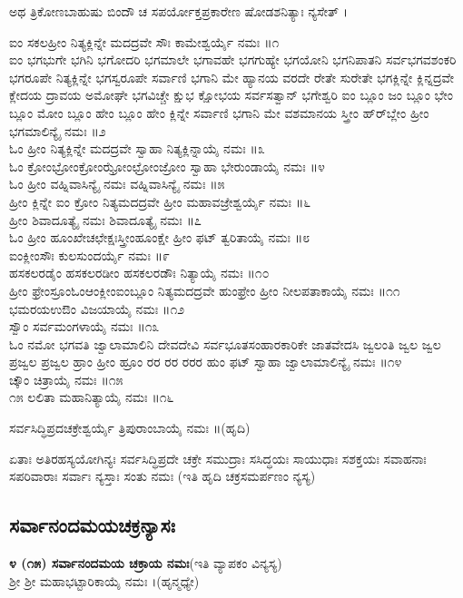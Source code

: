 ಅಥ ತ್ರಿಕೋಣಬಾಹುಷು ಬಿಂದೌ ಚ ಸಪರ್ಯೋಕ್ತಪ್ರಕಾರೇಣ ಷೋಡಶನಿತ್ಯಾಃ ನ್ಯಸೇತ್ ।

 ಐಂ ಸಕಲಹ್ರೀಂ ನಿತ್ಯಕ್ಲಿನ್ನೇ ಮದದ್ರವೇ ಸೌಃ  ಕಾಮೇಶ್ವರ್ಯೈ ನಮಃ ॥೧\\
 ಐಂ ಭಗಭುಗೇ ಭಗಿನಿ ಭಗೋದರಿ ಭಗಮಾಲೇ ಭಗಾವಹೇ ಭಗಗುಹ್ಯೇ ಭಗಯೋನಿ ಭಗನಿಪಾತನಿ ಸರ್ವಭಗವಶಂಕರಿ ಭಗರೂಪೇ ನಿತ್ಯಕ್ಲಿನ್ನೇ ಭಗಸ್ವರೂಪೇ ಸರ್ವಾಣಿ ಭಗಾನಿ ಮೇ ಹ್ಯಾನಯ ವರದೇ ರೇತೇ ಸುರೇತೇ ಭಗಕ್ಲಿನ್ನೇ ಕ್ಲಿನ್ನದ್ರವೇ ಕ್ಲೇದಯ ದ್ರಾವಯ ಅಮೋಘೇ ಭಗವಿಚ್ಚೇ ಕ್ಷುಭ ಕ್ಷೋಭಯ ಸರ್ವಸತ್ವಾನ್ ಭಗೇಶ್ವರಿ ಐಂ ಬ್ಲೂಂ ಜಂ ಬ್ಲೂಂ ಭೇಂ ಬ್ಲೂಂ ಮೋಂ ಬ್ಲೂಂ ಹೇಂ ಬ್ಲೂಂ ಹೇಂ ಕ್ಲಿನ್ನೇ ಸರ್ವಾಣಿ ಭಗಾನಿ ಮೇ ವಶಮಾನಯ ಸ್ತ್ರೀಂ ಹ್‌ರ್‌ಬ್ಲೇಂ ಹ್ರೀಂ  ಭಗಮಾಲಿನ್ಯೈ ನಮಃ ॥೨\\
 ಓಂ ಹ್ರೀಂ ನಿತ್ಯಕ್ಲಿನ್ನೇ ಮದದ್ರವೇ ಸ್ವಾಹಾ  ನಿತ್ಯಕ್ಲಿನ್ನಾಯೈ ನಮಃ ॥೩\\
 ಓಂ ಕ್ರೋಂಭ್ರೋಂಕ್ರೋಂಝ್ರೋಂಛ್ರೋಂಜ್ರೋಂ ಸ್ವಾಹಾ  ಭೇರುಂಡಾಯೈ ನಮಃ ॥೪\\
 ಓಂ ಹ್ರೀಂ ವಹ್ನಿವಾಸಿನ್ಯೈ ನಮಃ  ವಹ್ನಿವಾಸಿನ್ಯೈ ನಮಃ ॥೫\\
 ಹ್ರೀಂ ಕ್ಲಿನ್ನೇ ಐಂ ಕ್ರೋಂ ನಿತ್ಯಮದದ್ರವೇ ಹ್ರೀಂ  ಮಹಾವಜ್ರೇಶ್ವರ್ಯೈ ನಮಃ ॥೬\\
 ಹ್ರೀಂ ಶಿವಾದೂತ್ಯೈ ನಮಃ  ಶಿವಾದೂತ್ಯೈ ನಮಃ ॥೭\\
 ಓಂ ಹ್ರೀಂ ಹೂಂಖೇಚಛೇಕ್ಷಃಸ್ತ್ರೀಂಹೂಂಕ್ಷೇ ಹ್ರೀಂ ಫಟ್  ತ್ವರಿತಾಯೈ ನಮಃ ॥೮\\
 ಐಂಕ್ಲೀಂಸೌಃ  ಕುಲಸುಂದರ್ಯೈ ನಮಃ ॥೯\\
 ಹಸಕಲರಡೈಂ ಹಸಕಲರಡೀಂ ಹಸಕಲರಡೌಃ  ನಿತ್ಯಾಯೈ ನಮಃ ॥೧೦\\
 ಹ್ರೀಂ ಫ್ರೇಂಸ್ರೂಂಓಂಆಂಕ್ಲೀಂಐಂಬ್ಲೂಂ ನಿತ್ಯಮದದ್ರವೇ ಹುಂಫ್ರೇಂ ಹ್ರೀಂ  ನೀಲಪತಾಕಾಯೈ ನಮಃ ॥೧೧\\
 ಭಮರಯಉಔಂ  ವಿಜಯಾಯೈ ನಮಃ ॥೧೨\\
 ಸ್ವೌಂ  ಸರ್ವಮಂಗಳಾಯೈ ನಮಃ ॥೧೩\\
 ಓಂ ನಮೋ ಭಗವತಿ ಜ್ವಾಲಾಮಾಲಿನಿ ದೇವದೇವಿ ಸರ್ವಭೂತಸಂಹಾರಕಾರಿಕೇ ಜಾತವೇದಸಿ ಜ್ವಲಂತಿ ಜ್ವಲ ಜ್ವಲ ಪ್ರಜ್ವಲ ಪ್ರಜ್ವಲ ಹ್ರಾಂ ಹ್ರೀಂ ಹ್ರೂಂ ರರ ರರ ರರರ ಹುಂ ಫಟ್ ಸ್ವಾಹಾ  ಜ್ವಾಲಾಮಾಲಿನ್ಯೈ ನಮಃ ॥೧೪\\
 ಚ್ಕೌಂ  ಚಿತ್ರಾಯೈ ನಮಃ ॥೧೫\\
 ೧೫  ಲಲಿತಾ ಮಹಾನಿತ್ಯಾಯೈ ನಮಃ ॥೧೬ 

 ಸರ್ವಸಿದ್ಧಿಪ್ರದಚಕ್ರೇಶ್ವರ್ಯೈ ತ್ರಿಪುರಾಂಬಾಯೈ ನಮಃ ॥(ಹೃದಿ)

 ಏತಾಃ ಅತಿರಹಸ್ಯಯೋಗಿನ್ಯಃ ಸರ್ವಸಿದ್ಧಿಪ್ರದೇ ಚಕ್ರೇ ಸಮುದ್ರಾಃ ಸಸಿದ್ಧಯಃ ಸಾಯುಧಾಃ ಸಶಕ್ತಯಃ ಸವಾಹನಾಃ ಸಪರಿವಾರಾಃ ಸರ್ವಾಃ ನ್ಯಸ್ತಾಃ ಸಂತು ನಮಃ (ಇತಿ ಹೃದಿ ಚಕ್ರಸಮರ್ಪಣಂ ನ್ಯಸ್ಯ)
\subsection{ಸರ್ವಾನಂದಮಯಚಕ್ರನ್ಯಾಸಃ}
{\bfseries ೪ (೧೫) ಸರ್ವಾನಂದಮಯ ಚಕ್ರಾಯ ನಮಃ}(ಇತಿ ವ್ಯಾಪಕಂ ವಿನ್ಯಸ್ಯ)\\
 ಶ್ರೀ ಶ್ರೀ ಮಹಾಭಟ್ಟಾರಿಕಾಯೈ ನಮಃ ।(ಹೃನ್ಮಧ್ಯೇ)

